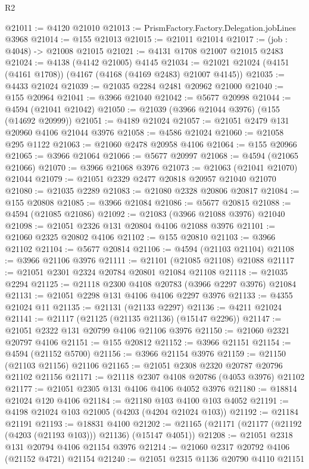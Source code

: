\begin{lexlean}{R2}
\begin{coremodule}
@21011 := @4120 @21010
@21013 := PrismFactory.Factory.Delegation.jobLines @3968
@21014 := @155 @21013
@21015 := @21011 @21014
@21017 := (job : @4048) -> @21008 @21015
@21021 := @4131 @1708 @21007 @21015 @2483
@21024 := @4138 (@4142 @21005) @4145
@21034 := @21021 @21024 (@4151 (@4161 @1708)) (@4167 (@4168 (@4169 @2483) @21007 @4145))
@21035 := @4433 @21024
@21039 := @21035 @2284 @2481 @20962 @21000
@21040 := @155 @20964
@21041 := @3966 @21040
@21042 := @5677 @20998
@21044 := @4594 (@21041 @21042)
@21050 := @21039 (@3966 @21044 @3976) (@155 (@14692 @20999))
@21051 := @4189 @21024
@21057 := @21051 @2479 @131 @20960 @4106 @21044 @3976
@21058 := @4586 @21024
@21060 := @21058 @295 @1122
@21063 := @21060 @2478 @20958 @4106
@21064 := @155 @20966
@21065 := @3966 @21064
@21066 := @5677 @20997
@21068 := @4594 (@21065 @21066)
@21070 := @3966 @21068 @3976
@21073 := @21063 (@21041 @21070) @21044
@21079 := @21051 @2329 @2477 @20818 @20957 @21040 @21070
@21080 := @21035 @2289
@21083 := @21080 @2328 @20806 @20817
@21084 := @155 @20808
@21085 := @3966 @21084
@21086 := @5677 @20815
@21088 := @4594 (@21085 @21086)
@21092 := @21083 (@3966 @21088 @3976) @21040
@21098 := @21051 @2326 @131 @20804 @4106 @21088 @3976
@21101 := @21060 @2325 @20802 @4106
@21102 := @155 @20810
@21103 := @3966 @21102
@21104 := @5677 @20814
@21106 := @4594 (@21103 @21104)
@21108 := @3966 @21106 @3976
@21111 := @21101 (@21085 @21108) @21088
@21117 := @21051 @2301 @2324 @20784 @20801 @21084 @21108
@21118 := @21035 @2294
@21125 := @21118 @2300 @4108 @20783 (@3966 @2297 @3976) @21084
@21131 := @21051 @2298 @131 @4106 @4106 @2297 @3976
@21133 := @4355 @21024 @11
@21135 := @21131 (@21133 @2297)
@21136 := @4211 @21024
@21141 := @21117 (@21125 (@21135 @21136) (@15147 @2296))
@21147 := @21051 @2322 @131 @20799 @4106 @21106 @3976
@21150 := @21060 @2321 @20797 @4106
@21151 := @155 @20812
@21152 := @3966 @21151
@21154 := @4594 (@21152 @5700)
@21156 := @3966 @21154 @3976
@21159 := @21150 (@21103 @21156) @21106
@21165 := @21051 @2308 @2320 @20787 @20796 @21102 @21156
@21171 := @21118 @2307 @4108 @20786 (@4053 @3976) @21102
@21177 := @21051 @2305 @131 @4106 @4106 @4052 @3976
@21180 := @18814 @21024 @120 @4106
@21184 := @21180 @103 @4100 @103 @4052
@21191 := @4198 @21024 @103 @21005 (@4203 (@4204 @21024 @103))
@21192 := @21184 @21191
@21193 := @18831 @4100
@21202 := @21165 (@21171 (@21177 (@21192 (@4203 (@21193 @103))) @21136) (@15147 @4051))
@21208 := @21051 @2318 @131 @20794 @4106 @21154 @3976
@21214 := @21060 @2317 @20792 @4106 (@21152 @4721) @21154
@21240 := @21051
    @2315
    @1136
    @20790
    @4110
    @21151

\end{coremodule}
\end{lexlean}
